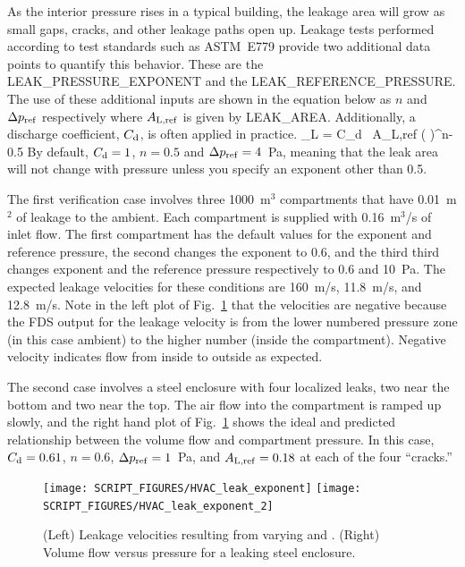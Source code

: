 \documentclass[11pt]{book}
\begin{document}
As the interior pressure rises in a typical building, the leakage area will grow as small gaps, cracks, and other leakage paths open up. Leakage tests performed according to test standards such as ASTM~E779 provide two additional data points to quantify this behavior. These are the {\ct LEAK\_PRESSURE\_EXPONENT} and the {\ct LEAK\_REFERENCE\_PRESSURE}. The use of these additional inputs are shown in the equation below as $n$ and $\Delta p_{\rm ref}$ respectively where $A_{\rm L,ref}$ is given by {\ct LEAK\_AREA}. Additionally, a discharge coefficient, $C_{\rm d}$, is often applied in practice.
\be  
   _{\rm L} = C_{\rm d} \, A_{\rm L,ref} \left(  \right)^{n-0.5}  
\ee
By default, $C_{\rm d}=1$, $n=0.5$ and $\Delta p_{\rm ref}=4$~Pa, meaning that the leak area will not change with pressure unless you specify an exponent other than 0.5.

The first verification case involves three 1000~m$^3$ compartments that have 0.01~m$^2$ of leakage to the ambient. Each compartment is supplied with 0.16~m$^3$/s of inlet flow. The first compartment has the default values for the exponent and reference pressure, the second changes the exponent to 0.6, and the third third changes exponent and the reference pressure respectively to 0.6 and 10~Pa. The expected leakage velocities for these conditions are 160~m/s, 11.8~m/s, and 12.8~m/s. Note in the left plot of Fig.~\ref{leak_exponent_fig} that the velocities are negative because the FDS output for the leakage velocity is from the lower numbered pressure zone (in this case ambient) to the higher number (inside the compartment). Negative velocity indicates flow from inside to outside as expected.

The second case involves a steel enclosure with four localized leaks, two near the bottom and two near the top. The air flow into the compartment is ramped up slowly, and the right hand plot of Fig.~\ref{leak_exponent_fig} shows the ideal and predicted relationship between the volume flow and compartment pressure. In this case, $C_{\rm d}=0.61$, $n=0.6$, $\Delta p_{\rm ref}=1$~Pa, and $A_{\rm L,ref}=0.18$ at each of the four ``cracks.''

\begin{figure}[ht]
\texttt{[image: SCRIPT\_FIGURES/HVAC\_leak\_exponent]}
\texttt{[image: SCRIPT\_FIGURES/HVAC\_leak\_exponent\_2]}
\caption[The  cases]{(Left) Leakage velocities resulting from varying  and . (Right) Volume flow versus pressure for a leaking steel enclosure.}
\label{leak_exponent_fig}
\end{figure}
\end{document}
